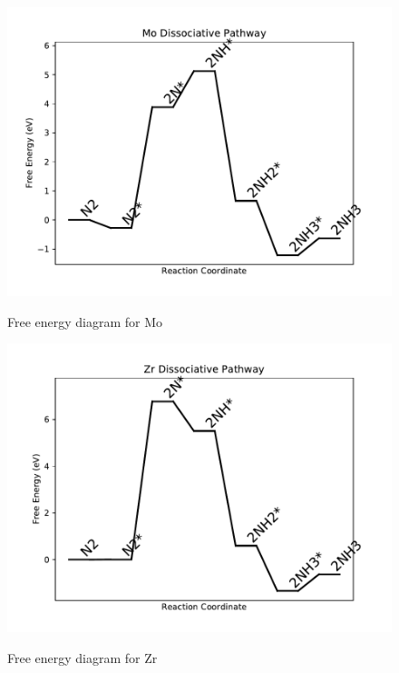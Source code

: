 \documentclass{article}
\begin{document}
\newpage
\begin{figure}
\includegraphics[width=1\linewidth]{data/plots/Mo_dissociative.pdf}
\label{fig:Mo_dissociative}
\caption{Free energy diagram for Mo}
\end{figure}

\begin{figure}
\includegraphics[width=1\linewidth]{data/plots/Zr_dissociative.pdf}
\label{fig:Zr_dissociative}
\caption{Free energy diagram for Zr}
\end{figure}
\end{document}
